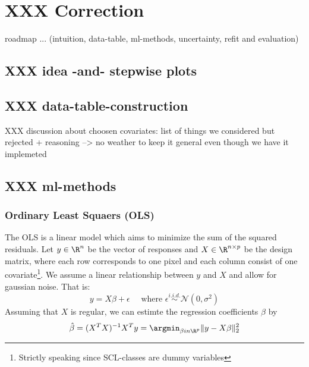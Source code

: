 \section{XXX Correction}{
    roadmap ... (intuition, data-table, ml-methods, uncertainty, refit and evaluation)

    \subsection{XXX idea -and- stepwise plots}
    
    \subsection{XXX data-table-construction}
        \label{sec:corr_data_table}
        XXX discussion about choosen covariates:
        list of things we considered but rejected + reasoning --> no weather to keep it general even though we have it implemeted

    \subsection{XXX ml-methods}{
        \subsubsection*{Ordinary Least Squaers (OLS)}{
            The OLS is a linear model which aims to minimize the sum of the squared residuals. Let $y\in \R^n$ be the vector of responses and $X\in \R^{n\times p}$ be the design matrix, where each row corresponds to one pixel and each column consist of one covariate\footnote{Strictly speaking since SCL-classes are dummy variables }. We assume a linear relationship between $y$ and $X$ and allow for gaussian noise. That is:
            \begin{equation}
                \label{eq:ols}
                y = X\beta  + \epsilon \quad \text{ where }\epsilon \overset{i.i.d.}{\sim}\mathcal{N}(0,\sigma^2)
            \end{equation}
            Assuming that $X$ is regular, we can estimte the regression coefficients $\beta$ by
            \begin{equation}
                \hat \beta = (X^TX)^{-1}X^Ty = \argmin_{\beta in \R^p}\|y - X\beta\|_2^2 
            \end{equation}

}}}
